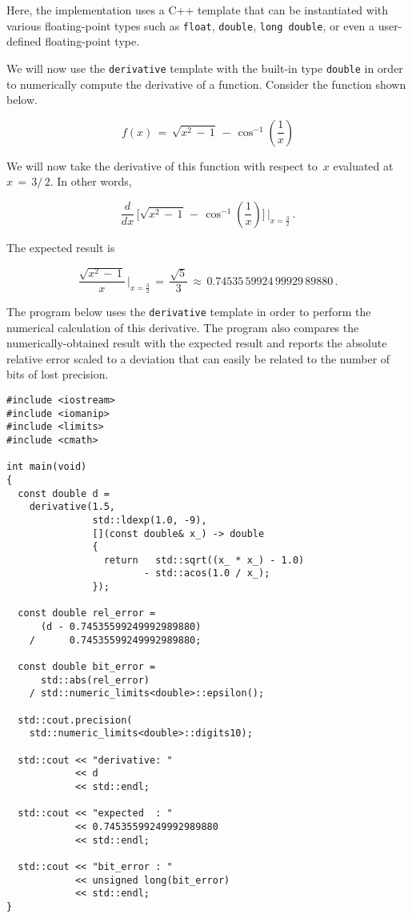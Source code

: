 \documentclass{article}[10pt]
\newcommand{\deriveval}[2][]{#1|_{#2}}
\begin{document}
Here, the implementation uses a C++ template that can be
instantiated with various floating-point types
such as {\lstinline|float|}, {\lstinline|double|},
{\lstinline|long double|}, or even a user-defined
floating-point type.

We will now use the {\lstinline|derivative|} template
with the built-in type {\lstinline|double|} in order to
numerically compute the derivative of a function.
Consider the function shown below.

\begin{equation}
f(x)
\,=\,
\sqrt{x^{2}\,-\,1}
\,-\,
\cos^{-1}\left(\dfrac{1}{x}\right)
\end{equation}

We will now take the derivative of this function with
respect to~$x$ evaluated at $x\,=\,3/\,2$. In other words,

\begin{equation}
\dfrac{d}{dx}\,
\Biggl[
\sqrt{x^{2}\,-\,1}
\,-\,
\cos^{-1}\left(\dfrac{1}{x}\right)
\Biggr]
\,\deriveval[\Bigg]{x=\frac{3}{2}}
\,{\text{.}}
\end{equation} 

The expected result is

\begin{equation}
\dfrac{\sqrt{x^{2}\,-\,1}}{x}
\,\deriveval[\Bigg]{x=\frac{3}{2}}
\,=\,
\dfrac{\sqrt{5}}{3}
\,\approx\,
0.74535\,59924\,99929\,89880
\,{\text{.}}
\end{equation} 

The program below uses the {\lstinline|derivative|} template
in order to perform the numerical calculation of this derivative.
The program also compares the numerically-obtained result
with the expected result and reports the absolute relative error
scaled to a deviation that can easily be related to the
number of bits of lost precision.

\begin{lstlisting}
#include <iostream>
#include <iomanip>
#include <limits>
#include <cmath>

int main(void)
{
  const double d =
    derivative(1.5,
               std::ldexp(1.0, -9),
               [](const double& x_) -> double
               {
                 return   std::sqrt((x_ * x_) - 1.0)
                        - std::acos(1.0 / x_);
               });

  const double rel_error =
      (d - 0.74535599249992989880)
    /      0.74535599249992989880;

  const double bit_error = 
      std::abs(rel_error)
    / std::numeric_limits<double>::epsilon();

  std::cout.precision(
    std::numeric_limits<double>::digits10);

  std::cout << "derivative: "
            << d
            << std::endl;

  std::cout << "expected  : "
            << 0.74535599249992989880
            << std::endl;

  std::cout << "bit_error : "
            << unsigned long(bit_error)
            << std::endl;
}
\end{lstlisting}
\end{document}
